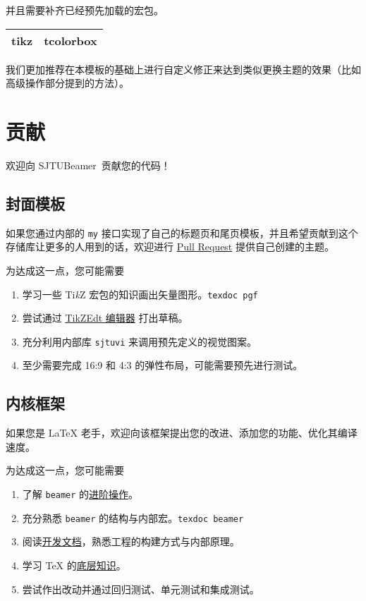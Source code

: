 \documentclass[
    UTF8,
    heading=true,
    12pt,
    a4paper
]{ctexrep}
\def\themename{\textsf{SJTUBeamer}}
\begin{document}
并且需要补齐已经预先加载的宏包。

\begin{table}[h]
  \centering
  \begin{tabular}{>{\sffamily}c>{\sffamily}c}
    \hline
    tikz & tcolorbox \\
    \hline
  \end{tabular}
\end{table}

我们更加推荐在本模板的基础上进行自定义修正来达到类似更换主题的效果（比如高级操作部分提到的方法）。


\chapter{贡献}

欢迎向 \themename\ 贡献您的代码！

\section{封面模板}

如果您通过内部的 \texttt{my} 接口实现了自己的标题页和尾页模板，并且希望贡献到这个存储库让更多的人用到的话，欢迎进行 \href{https://github.com/sjtug/SJTUBeamer/pulls}{Pull Request} 提供自己创建的主题。

为达成这一点，您可能需要
\begin{enumerate}
  \item 学习一些 Ti\textit{k}Z 宏包的知识画出矢量图形。\texttt{texdoc pgf}
  \item 尝试通过 \href{https://code.google.com/archive/p/tikzedt/downloads}{TikZEdt 编辑器} 打出草稿。
  \item 充分利用内部库 \texttt{sjtuvi} 来调用预先定义的视觉图案。
  \item 至少需要完成 16:9 和 4:3 的弹性布局，可能需要预先进行测试。
\end{enumerate}

\section{内核框架}

如果您是 \LaTeX{} 老手，欢迎向该框架提出您的改进、添加您的功能、优化其编译速度。

为达成这一点，您可能需要
\begin{enumerate}
  \item 了解 \texttt{beamer} 的\href{https://latex-beamer.com/}{进阶操作}。
  \item 充分熟悉 \texttt{beamer} 的结构与内部宏。\texttt{texdoc beamer}
  \item 阅读\href{run:sjtubeamerdevguide.pdf}{开发文档}，熟悉工程的构建方式与内部原理。
  \item 学习 \TeX{} 的\href{https://mirrors.sjtug.sjtu.edu.cn/CTAN/graphics/pgf/contrib/pgfplots/doc/TeX-programming-notes.pdf}{底层知识}。
  \item 尝试作出改动并通过回归测试、单元测试和集成测试。
\end{enumerate}
\end{document}
